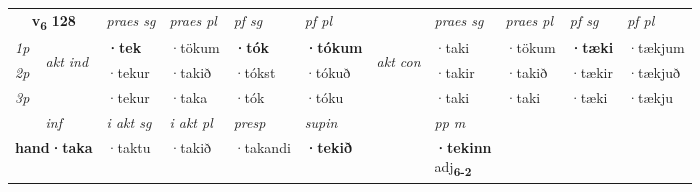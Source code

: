 \noindent
\begin{tabular}{lllllllllll} \toprule
\multicolumn{2}{c}{\textbf{v{\textsubscript{6}}} \Large{\textbf{128}}}  &  \textit{praes sg}  & \textit{praes pl}  &\textit{ pf sg} & \textit{pf pl} &  &  \textit{praes sg}  & \textit{praes pl}  & \textit{pf sg} & \textit{pf pl } \\*
	\cmidrule{3-6} \cmidrule{8-11}
 {\textit{1p}} & \multirow{3}{*}{\begin{turn}{90}\textit{akt ind}\end{turn}} & \textbf{·tek} & ·tökum & \textbf{·tók} & \textbf{·tókum} & \multirow{3}{*}{\begin{turn}{90}\textit{akt con}\end{turn}} &·taki & ·tökum & \textbf{·tæki} & ·tækjum\\*
 {\textit{2p}} &  &  ·tekur  & ·takið & ·tókst & ·tókuð & & ·takir & ·takið & ·tækir & ·tækjuð \\*
{\textit{3p}} &  & ·tekur & ·taka & ·tók & ·tóku & & ·taki & ·taki& ·tæki & ·tækju \\*
\cmidrule{3-6} \cmidrule{8-11}

   \multicolumn{2}{c}{\textit{inf}}  & \textit{i akt sg} & \textit{i akt pl}   & \textit{presp} & \textit{supin}  && \textit{pp m} \\*
  \multicolumn{2}{c}{\textbf{hand\allowbreak ·taka}} & ·taktu  & ·takið   & ·takandi &  \textbf{·tekið}  && \specialcell{\textbf{·tekinn} \\ adj\textbf{\textsubscript{6-2}}} \\*
\end{tabular}

